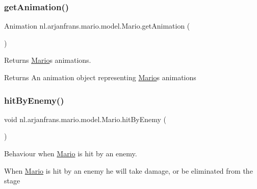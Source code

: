 \subsubsection{\texorpdfstring{get\+Animation()}{getAnimation()}}
{\footnotesize\ttfamily Animation nl.\+arjanfrans.\+mario.\+model.\+Mario.\+get\+Animation (\begin{DoxyParamCaption}{ }\end{DoxyParamCaption})}



Returns \hyperlink{classnl_1_1arjanfrans_1_1mario_1_1model_1_1Mario}{Mario}\textquotesingle{}s animations. 

\begin{DoxyReturn}{Returns}
An animation object representing \hyperlink{classnl_1_1arjanfrans_1_1mario_1_1model_1_1Mario}{Mario}\textquotesingle{}s animations 
\end{DoxyReturn}
\mbox{\label{classnl_1_1arjanfrans_1_1mario_1_1model_1_1Mario_a5f5b797929d57a1f55a39e1312c98c64}} 
\subsubsection{\texorpdfstring{hit\+By\+Enemy()}{hitByEnemy()}}
{\footnotesize\ttfamily void nl.\+arjanfrans.\+mario.\+model.\+Mario.\+hit\+By\+Enemy (\begin{DoxyParamCaption}{ }\end{DoxyParamCaption})\hspace{0.3cm}{\ttfamily [private]}}



Behaviour when \hyperlink{classnl_1_1arjanfrans_1_1mario_1_1model_1_1Mario}{Mario} is hit by an enemy. 

When \hyperlink{classnl_1_1arjanfrans_1_1mario_1_1model_1_1Mario}{Mario} is hit by an enemy he will take damage, or be eliminated from the stage \mbox{\label{classnl_1_1arjanfrans_1_1mario_1_1model_1_1Mario_a3c4265e4764640c191e8177975feaf53}} 

